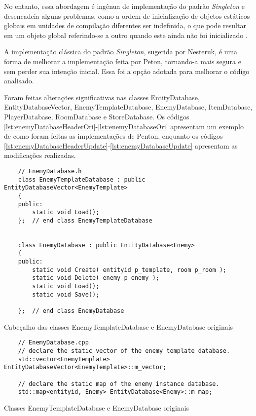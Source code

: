 No entanto, essa abordagem é ingênua de implementação do padrão \textit{Singleton} 
e desencadeia alguns problemas, como a ordem de inicialização de objetos estáticos 
globais em unidades de compilação diferentes ser indefinida, o que pode resultar
em um objeto global referindo-se a outro quando este ainda não foi inicializado \cite{nesteruk2018design}.

A implementação clássica do padrão \textit{Singleton}, sugerida por Nesteruk, é uma forma
de melhorar a implementação feita por Peton, tornando-a mais segura e sem perder sua intenção inicial.
Essa foi a opção adotada para melhorar o código analisado.

Foram feitas alterações significativas nas classes EntityDatabase, EntityDatabaseVector, 
EnemyTemplateDatabase, EnemyDatabase, ItemDatabase, PlayerDatabase, RoomDatabase e StoreDatabase. 
Os códigos \ref{lst:enemyDatabaseHeaderOri}-\ref{lst:enemyDatabaseOri} apresentam um exemplo 
de como foram feitas as implementações de Penton, enquanto os códigos 
\ref{lst:enemyDatabaseHeaderUpdate}-\ref{lst:enemyDatabaseUpdate} apresentam as modificações realizadas.

\begin{listing}[!ht]
    \begin{verbatim}
    // EnemyDatabase.h
    class EnemyTemplateDatabase : public EntityDatabaseVector<EnemyTemplate>
    {
    public:
        static void Load();
    };  // end class EnemyTemplateDatabase


    class EnemyDatabase : public EntityDatabase<Enemy>
    {
    public:
        static void Create( entityid p_template, room p_room );
        static void Delete( enemy p_enemy );
        static void Load();
        static void Save();

    };  // end class EnemyDatabase
    \end{verbatim}
\caption{Cabeçalho das classes EnemyTemplateDatabase e EnemyDatabase originais}
\label{lst:enemyDatabaseHeaderOri}
\end{listing}

\begin{listing}[!ht]
    \begin{verbatim}
    // EnemyDatabase.cpp
    // declare the static vector of the enemy template database.
    std::vector<EnemyTemplate> EntityDatabaseVector<EnemyTemplate>::m_vector;

    // declare the static map of the enemy instance database.
    std::map<entityid, Enemy> EntityDatabase<Enemy>::m_map;
    \end{verbatim}
\caption{Classes EnemyTemplateDatabase e EnemyDatabase originais}
\label{lst:enemyDatabaseOri}
\end{listing}

